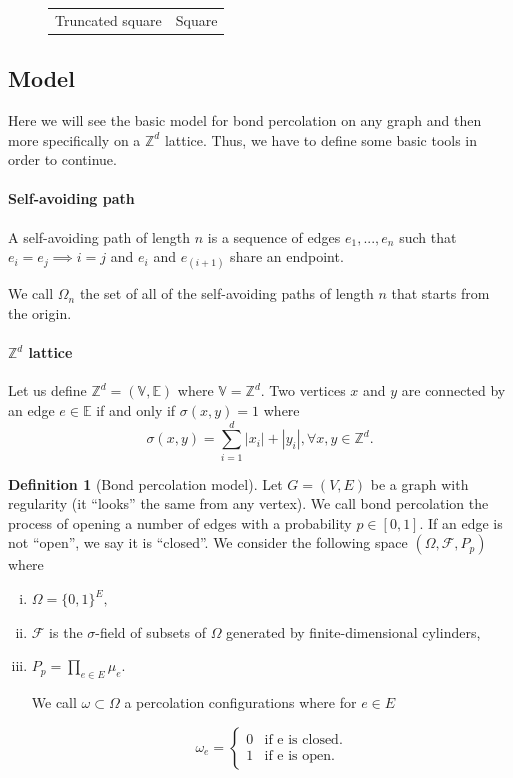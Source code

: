 \documentclass[a4paper,11pt]{article}
\theoremstyle{plain}
\theoremstyle{definition}
\newtheorem{definition}[theorem]{Definition}
\theoremstyle{remark}
\begin{document}
\begin{figure}
\begin{tabular}{cc}
Truncated square & Square\\[2pt]
\end{tabular}
\label{fig:lattices}
\end{figure}

\subsection{Model}
Here we will see the basic model for bond percolation on any graph and then more specifically on a $\mathbb{Z}^d$ lattice. Thus, we have to define some basic tools in order to continue.

\paragraph{Self-avoiding path}
A self-avoiding path of length $n$ is a sequence of edges $e_1, ..., e_n$ such that $e_i = e_j \implies i = j$ and $e_i$ and $e_{(i + 1)}$ share an endpoint.

We call $\Omega_n$ the set of all of the self-avoiding paths of length $n$ that starts from the origin.

\paragraph{$\mathbb{Z}^d$ lattice}
Let us define $\mathbb{Z}^d=(\mathbb{V},\mathbb{E})$ where $\mathbb{V}=\mathbb{Z}^d$.
Two vertices $x$ and $y$ are connected by an edge $e \in \mathbb{E}$ if and only if $\sigma(x,y) = 1$ where
\[ \sigma(x,y) = \sum_{i = 1}^{d}{|x_i|+|y_i|}, \forall x, y \in \mathbb{Z}^d.\]

\begin{definition}[Bond percolation model]
Let $G = (V,E)$ be a graph with regularity (it ``looks'' the same from any vertex). We call bond percolation the process of opening a number of edges with a probability $\textit{p}\in [0,1]$. If an edge is not ``open'', we say it is ``closed''.
We consider the following space $(\Omega, \mathscr{F}, P_p)$ where
\begin{enumerate}[(i)]
  \item $\Omega = \{0,1\}^E,$
  
  \item  $\mathscr{F}$ is the $\sigma$-field of subsets of $\Omega$ generated by finite-dimensional cylinders,
  
  \item $P_p = \prod_{e \in E}{\mu_{e}}.$
  
We call $\omega \subset \Omega$ a percolation configurations where for $e \in E$

$$
\omega_e = \left\{
    \begin{array}{ll}
        0 & \mbox{if e is closed.}\\
        1 & \mbox{if e is open.}
    \end{array}
\right.
$$
\end{enumerate}
\end{definition}
\end{document}
